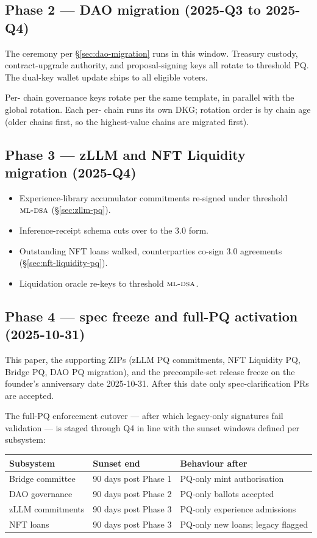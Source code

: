 \subsection{Phase 2 --- DAO migration (2025-Q3 to 2025-Q4)}

The \DAO{} ceremony per \S\ref{sec:dao-migration} runs in this window.
Treasury custody, contract-upgrade authority, and proposal-signing
keys all rotate to threshold PQ. The dual-key wallet update ships
to all eligible voters.

Per-\LLM{} chain governance keys rotate per the same template, in
parallel with the global \DAO{} rotation. Each per-\LLM{} chain runs
its own DKG; rotation order is by chain age (older chains first, so
the highest-value chains are migrated first).

\subsection{Phase 3 --- zLLM and NFT Liquidity migration (2025-Q4)}

\begin{itemize}[leftmargin=1.2em]
  \item Experience-library accumulator commitments re-signed under
        threshold $\textsc{ml-dsa}{}$ (\S\ref{sec:zllm-pq}).
  \item Inference-receipt schema cuts over to the 3.0 form.
  \item Outstanding NFT loans walked, counterparties co-sign 3.0
        agreements (\S\ref{sec:nft-liquidity-pq}).
  \item Liquidation oracle re-keys to threshold $\textsc{ml-dsa}{}$.
\end{itemize}

\subsection{Phase 4 --- spec freeze and full-PQ activation (2025-10-31)}

This paper, the supporting ZIPs (zLLM PQ commitments, NFT Liquidity
PQ, Bridge PQ, DAO PQ migration), and the precompile-set release
freeze on the founder's anniversary date 2025-10-31. After this
date only spec-clarification PRs are accepted.

The full-PQ enforcement cutover --- after which legacy-only
signatures fail validation --- is staged through Q4 in line with the
sunset windows defined per subsystem:

\begin{longtable}{p{}p{}p{}}
\toprule
\textbf{Subsystem} & \textbf{Sunset end} & \textbf{Behaviour after} \\
\midrule
Bridge committee & 90 days post Phase 1 & PQ-only mint authorisation \\
DAO governance & 90 days post Phase 2 & PQ-only ballots accepted \\
zLLM commitments & 90 days post Phase 3 & PQ-only experience admissions \\
NFT loans & 90 days post Phase 3 & PQ-only new loans; legacy flagged \\
\bottomrule
\end{longtable}

